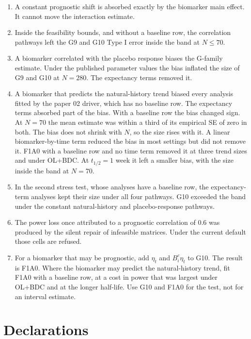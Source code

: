 \documentclass[
  11pt,
]{article}
\providecommand{\tightlist}{%
  \setlength{\itemsep}{0pt}\setlength{\parskip}{0pt}}
\begin{document}
\begin{enumerate}
\def\labelenumi{\arabic{enumi}.}
\tightlist
\item
  A constant prognostic shift is absorbed exactly by the biomarker
  main effect. It cannot move the interaction estimate.
\item
  Inside the feasibility bounds, and without a baseline row, the
  correlation pathways left the G9 and G10 Type I error inside the
  band at \(N \le 70\).
\item
  A biomarker correlated with the placebo response biases the
  G-family estimate. Under the published parameter values the bias
  inflated the size of G9 and G10 at \(N = 280\). The expectancy terms
  removed it.
\item
  A biomarker that predicts the natural-history trend biased every
  analysis fitted by the paper 02 driver, which has no baseline row.
  The expectancy terms absorbed part of the bias. With a baseline
  row the bias changed sign. At \(N = 70\) the mean estimate was
  within a third of its empirical SE of zero in both. The bias does
  not shrink with \(N\), so the size rises with it. A linear
  biomarker-by-time term reduced the bias in most settings but did
  not remove it. F1A0 with a baseline row and no time term removed it
  at three trend sizes and under OL+BDC. At \(t_{1/2} = 1\) week it
  left a smaller bias, with the size inside the band at \(N = 70\).
\item
  In the second stress test, whose analyses have a baseline row, the
  expectancy-term analyses kept their size under all four pathways.
  G10 exceeded the band under the constant natural-history and
  placebo-response pathways.
\item
  The power loss once attributed to a prognostic correlation of 0.6
  was produced by the silent repair of infeasible matrices. Under the
  current default those cells are refused.
\item
  For a biomarker that may be prognostic, add \(\eta_t\) and
  \(B^c_i\eta_t\) to G10. The result is F1A0. Where the biomarker may
  predict the natural-history trend, fit F1A0 with a baseline row,
  at a cost in power that was largest under OL+BDC and at the longer
  half-life. Use G10 and F1A0 for the test, not for an interval
  estimate.
\end{enumerate}

\section*{Declarations}\label{declarations}
\end{document}
